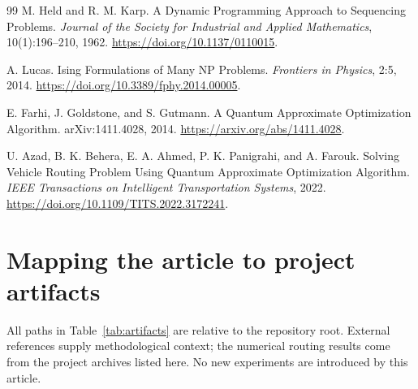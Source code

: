 \documentclass[11pt,a4paper]{article}
\begin{document}
\begin{thebibliography}{99}
M. Held and R. M. Karp.
\newblock A Dynamic Programming Approach to Sequencing Problems.
\newblock \emph{Journal of the Society for Industrial and Applied
Mathematics}, 10(1):196--210, 1962.
\newblock \url{https://doi.org/10.1137/0110015}.

A. Lucas.
\newblock Ising Formulations of Many NP Problems.
\newblock \emph{Frontiers in Physics}, 2:5, 2014.
\newblock \url{https://doi.org/10.3389/fphy.2014.00005}.

E. Farhi, J. Goldstone, and S. Gutmann.
\newblock A Quantum Approximate Optimization Algorithm.
\newblock arXiv:1411.4028, 2014.
\newblock \url{https://arxiv.org/abs/1411.4028}.

U. Azad, B. K. Behera, E. A. Ahmed, P. K. Panigrahi, and A. Farouk.
\newblock Solving Vehicle Routing Problem Using Quantum Approximate
Optimization Algorithm.
\newblock \emph{IEEE Transactions on Intelligent Transportation Systems}, 2022.
\newblock \url{https://doi.org/10.1109/TITS.2022.3172241}.

\end{thebibliography}

\appendix
\section{Mapping the article to project artifacts}
\label{app:artifacts}

All paths in Table~\ref{tab:artifacts} are relative to the repository root.
External references supply methodological context; the numerical routing
results come from the project archives listed here. No new experiments
are introduced by this article.
\end{document}
